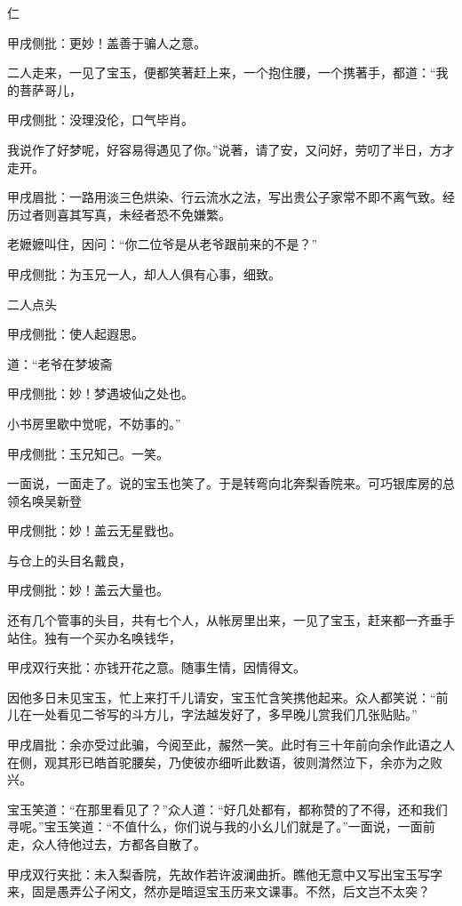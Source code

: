 \begin{parag}
仁\begin{note}甲戌侧批：更妙！盖善于骗人之意。\end{note}二人走来，一见了宝玉，便都笑著赶上来，一个抱住腰，一个携著手，都道：“我的菩萨哥儿，\begin{note}甲戌侧批：没理没伦，口气毕肖。\end{note}我说作了好梦呢，好容易得遇见了你。”说著，请了安，又问好，劳叨了半日，方才走开。\begin{note}甲戌眉批：一路用淡三色烘染、行云流水之法，写出贵公子家常不即不离气致。经历过者则喜其写真，未经者恐不免嫌繁。\end{note}老嬷嬷叫住，因问：“你二位爷是从老爷跟前来的不是？”\begin{note}甲戌侧批：为玉兄一人，却人人俱有心事，细致。\end{note}二人点头\begin{note}甲戌侧批：使人起遐思。\end{note}道：“老爷在梦坡斋\begin{note}甲戌侧批：妙！梦遇坡仙之处也。\end{note}小书房里歇中觉呢，不妨事的。”\begin{note}甲戌侧批：玉兄知己。一笑。\end{note}一面说，一面走了。说的宝玉也笑了。于是转弯向北奔梨香院来。可巧银库房的总领名唤吴新登\begin{note}甲戌侧批：妙！盖云无星戥也。\end{note}与仓上的头目名戴良，\begin{note}甲戌侧批：妙！盖云大量也。\end{note}还有几个管事的头目，共有七个人，从帐房里出来，一见了宝玉，赶来都一齐垂手站住。独有一个买办名唤钱华，\begin{note}甲戌双行夹批：亦钱开花之意。随事生情，因情得文。\end{note}因他多日未见宝玉，忙上来打千儿请安，宝玉忙含笑携他起来。众人都笑说：“前儿在一处看见二爷写的斗方儿，字法越发好了，多早晚儿赏我们几张贴贴。”\begin{note}甲戌眉批：余亦受过此骗，今阅至此，赧然一笑。此时有三十年前向余作此语之人在侧，观其形已皓首驼腰矣，乃使彼亦细听此数语，彼则潸然泣下，余亦为之败兴。\end{note}宝玉笑道：“在那里看见了？”众人道：“好几处都有，都称赞的了不得，还和我们寻呢。”宝玉笑道：“不值什么，你们说与我的小幺儿们就是了。”一面说，一面前走，众人待他过去，方都各自散了。\begin{note}甲戌双行夹批：未入梨香院，先故作若许波澜曲折。瞧他无意中又写出宝玉写字来，固是愚弄公子闲文，然亦是暗逗宝玉历来文课事。不然，后文岂不太突？\end{note}
\end{parag}


